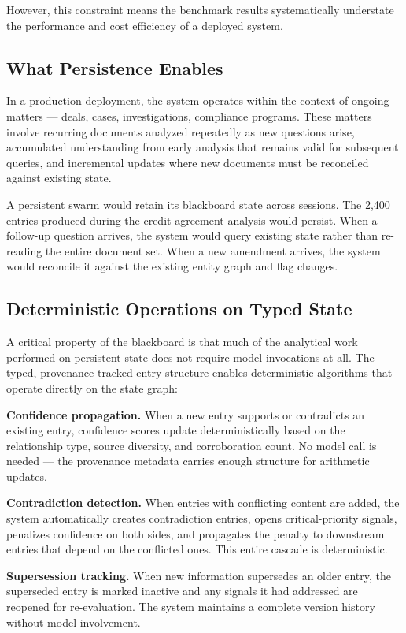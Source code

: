 \documentclass[11pt,a4paper]{article}
\begin{document}
However, this constraint means the benchmark results systematically understate the performance and cost efficiency of a deployed system.

\subsection{What Persistence Enables}

In a production deployment, the system operates within the context of ongoing matters — deals, cases, investigations, compliance programs. These matters involve recurring documents analyzed repeatedly as new questions arise, accumulated understanding from early analysis that remains valid for subsequent queries, and incremental updates where new documents must be reconciled against existing state.

A persistent swarm would retain its blackboard state across sessions. The 2,400 entries produced during the credit agreement analysis would persist. When a follow-up question arrives, the system would query existing state rather than re-reading the entire document set. When a new amendment arrives, the system would reconcile it against the existing entity graph and flag changes.

\subsection{Deterministic Operations on Typed State}

A critical property of the blackboard is that much of the analytical work performed on persistent state does not require model invocations at all. The typed, provenance-tracked entry structure enables deterministic algorithms that operate directly on the state graph:

\textbf{Confidence propagation.} When a new entry supports or contradicts an existing entry, confidence scores update deterministically based on the relationship type, source diversity, and corroboration count. No model call is needed — the provenance metadata carries enough structure for arithmetic updates.

\textbf{Contradiction detection.} When entries with conflicting content are added, the system automatically creates contradiction entries, opens critical-priority signals, penalizes confidence on both sides, and propagates the penalty to downstream entries that depend on the conflicted ones. This entire cascade is deterministic.

\textbf{Supersession tracking.} When new information supersedes an older entry, the superseded entry is marked inactive and any signals it had addressed are reopened for re-evaluation. The system maintains a complete version history without model involvement.
\end{document}
